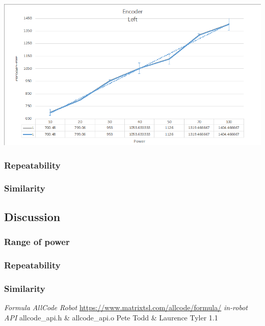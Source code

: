 \documentclass[11pt,a4paper,titlepage]{article}
\begin{document}
	\includegraphics[width=\textwidth,height=\textheight,keepaspectratio]{EncodersLeft}
	\subsubsection{Repeatability}
	\subsubsection{Similarity}

\subsection{Discussion}
	\subsubsection{Range of power}
	\subsubsection{Repeatability}
	\subsubsection{Similarity}

\clearpage
{}
\begin{thebibliography}{5}
 \emph{Formula AllCode Robot}
\url{https://www.matrixtsl.com/allcode/formula/}
 \emph{in-robot API}
allcode\_api.h \& allcode\_api.o
Pete Todd \& Laurence Tyler 1.1
\end{thebibliography}
\clearpage

\label{thelastpage}
\end{document}
